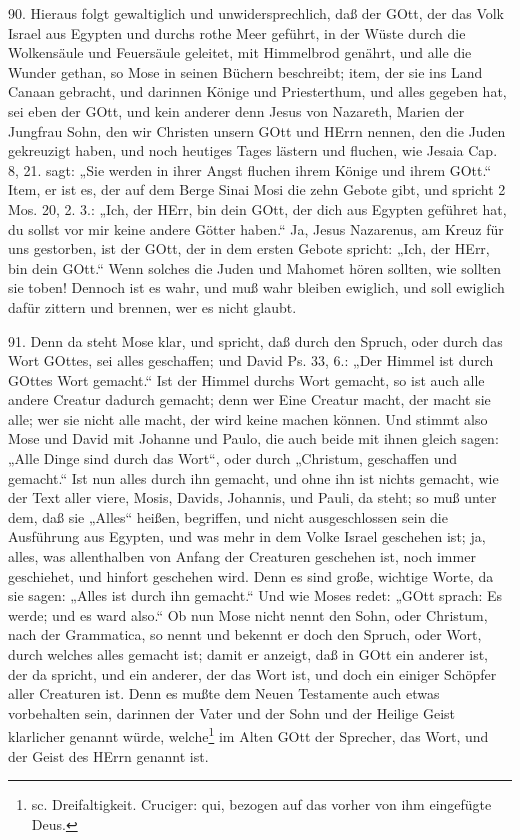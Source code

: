 90. Hieraus folgt gewaltiglich und unwidersprechlich, daß der GOtt, der das Volk Israel aus Egypten und durchs rothe Meer geführt, in der Wüste durch die Wolkensäule und Feuersäule geleitet, mit Himmelbrod genährt, und alle die Wunder gethan, so Mose in seinen Büchern beschreibt; item, der sie ins Land Canaan gebracht, und darinnen Könige und Priesterthum, und alles gegeben hat, sei eben der GOtt, und kein anderer denn Jesus von Nazareth, Marien der Jungfrau Sohn, den wir Christen unsern GOtt und HErrn nennen, den die Juden gekreuzigt haben, und noch heutiges Tages lästern und fluchen, wie Jesaia Cap. 8, 21. sagt: „Sie werden in ihrer Angst fluchen ihrem Könige und ihrem GOtt.“ Item, er ist es, der auf dem Berge Sinai Mosi die zehn Gebote gibt, und spricht 2 Mos. 20, 2. 3.: „Ich, der HErr, bin dein GOtt, der dich aus Egypten geführet hat, du sollst vor mir keine andere Götter haben.“ Ja, Jesus Nazarenus, am Kreuz für uns gestorben, ist der GOtt, der in dem ersten Gebote spricht: „Ich, der HErr, bin dein GOtt.“ Wenn solches die Juden und Mahomet hören sollten, wie sollten sie toben! Dennoch ist es wahr, und
muß wahr bleiben ewiglich, und soll ewiglich dafür zittern und brennen, wer es nicht glaubt.

91. Denn da steht Mose klar, und spricht, daß durch den Spruch, oder durch das Wort GOttes, sei alles geschaffen; und David Ps. 33, 6.: „Der Himmel ist durch GOttes Wort gemacht.“ Ist der Himmel durchs Wort gemacht, so ist auch alle andere Creatur dadurch gemacht; denn wer Eine Creatur macht, der macht sie alle; wer sie nicht alle macht, der wird keine machen können. Und stimmt also Mose und David mit Johanne und Paulo, die auch beide mit ihnen gleich sagen: „Alle Dinge sind durch das Wort“, oder durch „Christum, geschaffen und gemacht.“ Ist nun alles durch ihn gemacht, und ohne ihn ist nichts gemacht, wie der Text aller viere, Mosis, Davids, Johannis, und Pauli, da steht; so muß unter dem, daß sie „Alles“ heißen, begriffen, und nicht ausgeschlossen sein die Ausführung aus Egypten, und was mehr in dem Volke Israel geschehen ist; ja, alles, was allenthalben von Anfang der Creaturen geschehen ist, noch immer geschiehet, und hinfort geschehen wird. Denn es sind große, wichtige Worte, da sie sagen: „Alles ist durch ihn gemacht.“ Und wie Moses redet: „GOtt sprach: Es werde; und es ward also.“ Ob nun Mose nicht nennt den Sohn, oder Christum, nach der Grammatica, so nennt und bekennt er doch den Spruch, oder Wort, durch welches alles gemacht ist; damit er anzeigt, daß in GOtt ein anderer ist, der da spricht, und ein anderer, der das Wort ist, und doch ein einiger Schöpfer aller Creaturen ist. Denn es mußte dem Neuen Testamente auch etwas vorbehalten sein, darinnen der Vater und der Sohn und der Heilige Geist klarlicher genannt würde, welche\footnote{sc. Dreifaltigkeit. Cruciger: qui, bezogen auf das vorher von ihm eingefügte Deus.} im Alten GOtt der Sprecher, das Wort, und der Geist des HErrn genannt ist.

